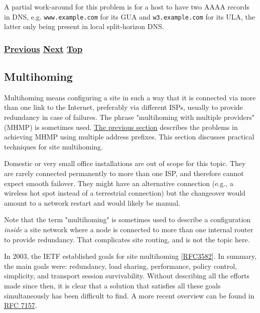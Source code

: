\documentclass[
]{article}
\begin{document}
A partial work-around for this problem is for a host to have two AAAA
records in DNS, e.g. \texttt{www.example.com} for its GUA and
\texttt{w3.example.com} for its ULA, the latter only being present in
local split-horizon DNS.

\subsubsection{\texorpdfstring{\hyperref[security-operation]{Previous}
\hyperref[multihoming]{Next}
\hyperref[management-and-operations]{Top}}{Previous Next Top}}\label{previous-next-top-30}

\pagebreak

\subsection{Multihoming}\label{multihoming}

Multihoming means configuring a site in such a way that it is connected
via more than one link to the Internet, preferably via different ISPs,
usually to provide redundancy in case of failures. The phrase
"multihoming with multiple providers" (MHMP) is sometimes used.
\hyperref[multi-prefix-operation]{The previous section} describes the
problems in achieving MHMP using multiple address prefixes. This section
discusses practical techniques for site multihoming.

Domestic or very small office installations are out of scope for this
topic. They are rarely connected permanently to more than one ISP, and
therefore cannot expect smooth failover. They might have an alternative
connection (e.g., a wireless hot spot instead of a terrestrial
connection) but the changeover would amount to a network restart and
would likely be manual.

Note that the term "multihoming" is sometimes used to describe a
configuration \emph{inside} a site network where a node is connected to
more than one internal router to provide redundancy. That complicates
site routing, and is not the topic here.

In 2003, the IETF established goals for site multihoming
{[}\href{https://www.rfc-editor.org/info/rfc3582}{RFC3582}{]}. In
summary, the main goals were: redundancy, load sharing, performance,
policy control, simplicity, and transport session survivability. Without
describing all the efforts made since then, it is clear that a solution
that satisfies all these goals simultaneously has been difficult to
find. A more recent overview can be found in
\href{https://www.rfc-editor.org/info/rfc7157}{RFC 7157}.
\end{document}
